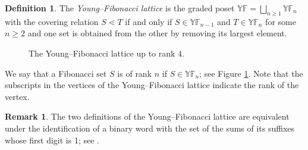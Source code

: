 \documentclass[12pt,reqno]{amsart}
\numberwithin{equation}{section}
\theoremstyle{definition}
\newtheorem{definition}[theorem]{Definition}
\theoremstyle{definition}
\newtheorem{remark}[theorem]{Remark}
\newcommand{\YF}{\mathbb{YF}}
\begin{document}
\begin{definition}
    The \emph{Young--Fibonacci lattice} is the graded poset $\YF=\bigsqcup_{n\geq 1} \YF_n$ with the covering relation $S \lessdot T$ if and only if $S \in \YF_{n-1}$ and $T \in \YF_n$ for some $n\geq 2$ and one set is obtained from the other by removing its largest element.
\end{definition}
\begin{figure}[ht]
\centering




\caption{The Young--Fibonacci lattice up to rank $4$.}
\label{YF2}
\end{figure} We say that a Fibonacci set $S$ is of rank $n$ if $S \in \YF_n$; see Figure \ref{YF2}.
Note that the subscripts in the vertices of the Young--Fibonacci lattice indicate the rank of the vertex.

\begin{remark}\label{YF equivalence}
    The two definitions of the Young--Fibonacci lattice are equivalent under the identification of a binary word with the set of the sums of its suffixes whose first digit is 1; see \cite[Propositions 4.8 and 4.9]{HivertScott}.
\end{remark}
\end{document}
